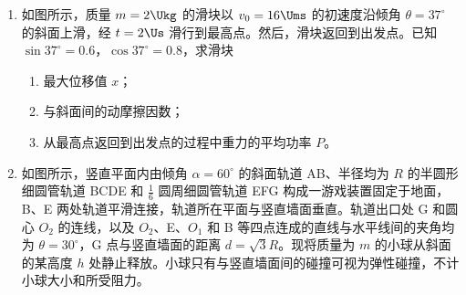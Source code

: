 \documentclass[\gkver]{gaokaozhenti}
\begin{document}
\begin{enumerate}
{

根据闭合电路欧姆定律 $E = U + Ir$ 可以绘制 $U-I$ 图像求解电动势和内阻。

（2）变压器的正视图如图


所以硅钢片应平行于平面 $aehd$，即选 D。
}

\item
如图所示，质量 $m = 2 \Ukg$ 的滑块以 $v_{0} = 16 \Ums$ 的初速度沿倾角 $\theta = 37^{\circ}$ 的斜面上滑，经 $t = 2 \Us$ 滑行到最高点。然后，滑块返回到出发点。已知 $\sin37^{\circ} = 0.6$，$\cos37^{\circ} = 0.8$，求滑块

\begin{enumerate}
	\item
	最大位移值 $x$；
	\item
	与斜面间的动摩擦因数；
	\item
	从最高点返回到出发点的过程中重力的平均功率 $P$。
\end{enumerate}



\item
如图所示，竖直平面内由倾角 $\alpha = 60^{\circ}$ 的斜面轨道 AB、半径均为 $R$ 的半圆形细圆管轨道 BCDE 和 $\frac{1}{6}$ 圆周细圆管轨道 EFG 构成一游戏装置固定于地面，B、E 两处轨道平滑连接，轨道所在平面与竖直墙面垂直。轨道出口处 G 和圆心 $O_{2}$ 的连线，以及 $O_{2}$、E、$O_{1}$ 和 B 等四点连成的直线与水平线间的夹角均为 $\theta = 30^{\circ}$，G 点与竖直墙面的距离 $d = \sqrt{3}R$。现将质量为 $m$ 的小球从斜面的某高度 $h$ 处静止释放。小球只有与竖直墙面间的碰撞可视为弹性碰撞，不计小球大小和所受阻力。


\end{enumerate}
\end{document}
